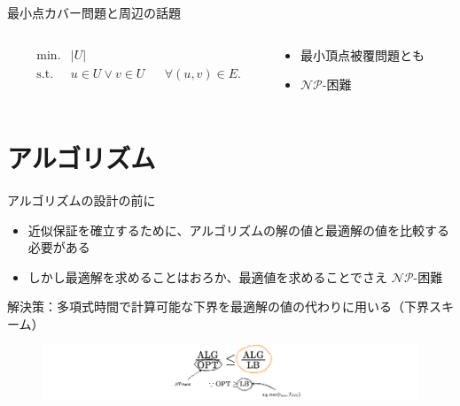 \documentclass[aspectratio=169]{beamer}
\begin{document}
\begin{frame}{最小点カバー問題と周辺の話題}
	\begin{columns}
		\begin{column}{0.5\columnwidth}
			\begin{problem}[最小点カバー問題]

			\begin{align*}
				 & \text{min.}  & |U|                                             \\
				 & \text{s.t. } & u \in U \lor v \in U &  & \forall (u, v) \in E.
			\end{align*}
			\end{problem}
		\end{column}
		\begin{column}{0.5\columnwidth}
			\begin{itemize}
				\item 最小頂点被覆問題とも
				\item $\mathcal{NP}$-困難
			\end{itemize}
		\end{column}
	\end{columns}
\end{frame}


\section{アルゴリズム}

\begin{frame}{アルゴリズムの設計の前に}
	\begin{itemize}
		\item 近似保証を確立するために、アルゴリズムの解の値と最適解の値を比較する必要がある
		\item しかし最適解を求めることはおろか、最適値を求めることでさえ $\mathcal{NP}$-困難
	\end{itemize}

	解決策：\alert{多項式時間で計算可能な下界を最適解の値の代わりに用いる（下界スキーム）}
	\begin{figure}
		\centering
		\includegraphics[width=1.4\textwidth]{figures/lower-bounding-scheme.png}
	\end{figure}
\end{frame}
\end{document}
